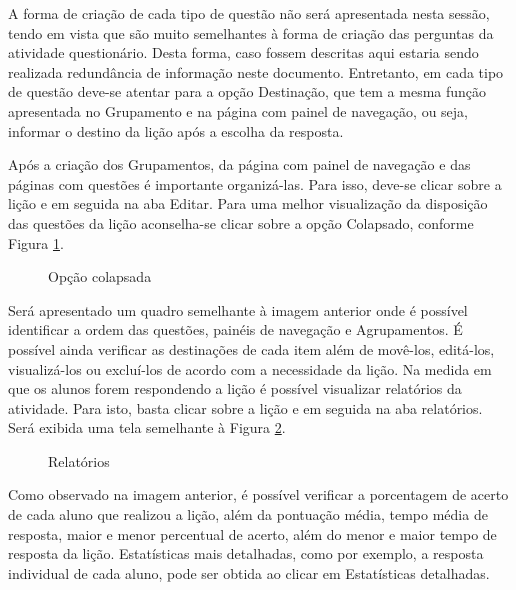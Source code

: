 A forma de criação de cada tipo de questão não será apresentada nesta sessão, tendo em vista que são muito semelhantes à forma de criação das perguntas da atividade questionário. Desta forma, caso fossem descritas aqui estaria sendo realizada redundância de informação neste documento. Entretanto, em cada tipo de questão deve-se atentar para a opção Destinação, que tem a mesma função apresentada no Grupamento e na página com painel de navegação, ou seja, informar o destino da lição após a escolha da resposta.

Após a criação dos Grupamentos, da página com painel de navegação e das páginas com questões é importante organizá-las. Para isso, deve-se clicar sobre a lição e em seguida na aba Editar. Para uma melhor visualização da disposição das questões da lição aconselha-se clicar sobre a opção Colapsado, conforme Figura \ref{fig:cap5_56}.

\begin{figure}[htbp]
 \begin{center}
  \caption{Opção colapsada}
  \label{fig:cap5_56}
 \end{center}
\end{figure}
Será apresentado um quadro semelhante à imagem anterior onde é possível identificar a ordem das questões, painéis de navegação e Agrupamentos. É possível ainda verificar as destinações de cada item além de movê-los, editá-los, visualizá-los ou excluí-los de acordo com a necessidade da lição.
Na medida em que os alunos forem respondendo a lição é possível visualizar relatórios da atividade. Para isto, basta clicar sobre a lição e em seguida na aba relatórios. Será exibida uma tela semelhante à Figura \ref{fig:cap5_57}.
\begin{figure}[htbp]
 \begin{center}
  \caption{Relatórios}
  \label{fig:cap5_57}
 \end{center}
\end{figure}
Como observado na imagem anterior, é possível verificar a porcentagem de acerto de cada aluno que realizou a lição, além da pontuação média, tempo média de resposta, maior e menor percentual de acerto, além do menor e maior tempo de resposta da lição. Estatísticas mais detalhadas, como por exemplo, a resposta individual de cada aluno, pode ser obtida ao clicar em Estatísticas detalhadas.

